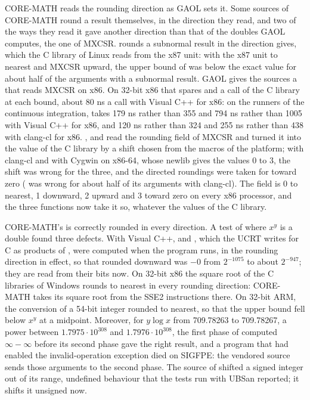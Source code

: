 \documentclass[12pt,a4paper,twoside,openright]{book}
\begin{document}
\medskip
CORE-MATH reads the rounding direction as GAOL sets it.\newinvfive{} Some
sources of CORE-MATH round a result themselves, in the direction they read,
and two of the ways they read it gave another direction than that of the
doubles GAOL computes, the one of MXCSR.  rounds a subnormal
result in the direction  gives, which the C library of
Linux reads from the x87 unit: with the x87 unit to nearest and MXCSR upward,
the upper bound of  was below the exact value for about half of the
arguments with a subnormal result. GAOL gives the sources a
 that reads MXCSR on x86. On 32-bit x86 that spares
 and  a call of the C library at each bound, about
80 ns a call with Visual C++ for x86: on the runners of the continuous
integration,  takes 179 ns rather than 355 and
 794 ns rather than 1005 with Visual C++ for x86, and 120 ns
rather than 324 and 255 ns rather than 438 with clang-cl for x86.
,  and  read the rounding field of MXCSR
and turned it into the  value of the C library by a shift chosen
from the macros of the platform; with clang-cl and with Cygwin on x86-64,
whose newlib gives  the values 0 to 3, the shift was wrong for
the three, and the directed roundings were taken for toward zero
( was wrong for about half of its arguments with clang-cl). The
field is 0 to nearest, 1 downward, 2 upward and 3 toward zero on every x86
processor, and the three functions now take it so, whatever the values of
the C library.

\medskip
CORE-MATH's  is correctly rounded in every direction. A test of
 where $x^y$ is a double found three defects. With Visual C++,
 and , which the UCRT writes for C as products of
, were computed when the program runs, in the rounding direction
in effect, so that  rounded downward was $-0$ from $2^{-1075}$ to
about $2^{-947}$; they are read from their bits now. On 32-bit x86 the square
root of the C libraries of Windows rounds to nearest in every rounding
direction: CORE-MATH takes its square root from the SSE2 instructions there.
On 32-bit ARM, the conversion of a 54-bit integer rounded to nearest, so that
the upper bound fell below $x^y$ at a midpoint. Moreover, for $y \log x$
from 709.78263 to 709.78267, a power between $1.7975 \cdot 10^{308}$ and
$1.7976 \cdot 10^{308}$, the first phase of  computed
$\infty - \infty$ before its second phase gave the right result, and a
program that had enabled the invalid-operation exception died on SIGFPE: the
vendored source sends those arguments to the second phase. The source of
 shifted a signed integer out of its range, undefined behaviour
that the tests run with UBSan reported; it shifts it unsigned now.
\end{document}
